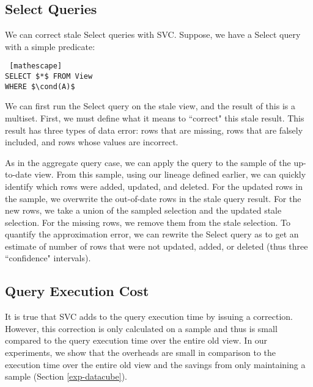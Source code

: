 \subsection{Select Queries}
We can correct stale Select queries with SVC.
Suppose, we have a Select query with a simple predicate:
\begin{lstlisting} [mathescape]
SELECT $*$ FROM View 
WHERE $\cond(A)$
\end{lstlisting}

We can first run the Select query on the stale view, and the result of this is a multiset.
First, we must define what it means to ``correct" this stale result.
This result has three types of data error: rows that are missing, rows that are falsely included, and rows whose values are incorrect.

As in the aggregate query case, we can apply the query to the sample of the up-to-date view.
From this sample, using our lineage defined earlier, we can quickly identify which rows were added, updated, and deleted.
For the updated rows in the sample, we overwrite the out-of-date rows in the stale query result.
For the new rows, we take a union of the sampled selection and the updated stale selection.
For the missing rows, we remove them from the stale selection.
To quantify the approximation error, we can rewrite the Select query as \countfunc to get an estimate of number of rows that were not updated, added, or deleted (thus three ``confidence" intervals). 

\subsection{Query Execution Cost}
It is true that SVC adds to the query execution time by issuing a correction. 
However, this correction is only calculated on a sample and thus is small compared to the query execution time over the entire old view.
In our experiments, we show that the overheads are small in comparison to the execution time over the entire old view and the savings from only maintaining a sample (Section \ref{exp-datacube}).
